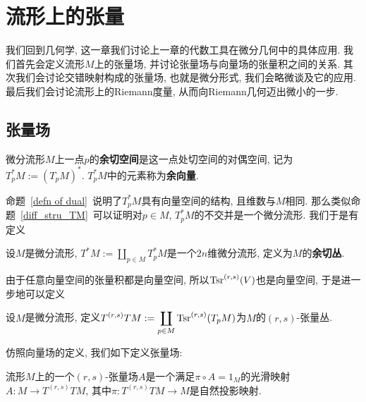 \chapter{流形上的张量}\label{chapter_tensorfield}
我们回到几何学, 这一章我们讨论上一章的代数工具在微分几何中的具体应用.
我们首先会定义流形$M$上的张量场, 并讨论张量场与向量场的张量积之间的关系.
其次我们会讨论交错映射构成的张量场, 也就是微分形式, 我们会略微谈及它的应用.
最后我们会讨论流形上的Riemann度量, 从而向Riemann几何迈出微小的一步.

\section{张量场}\label{section_tensorfield}
\begin{defn}
    微分流形$M$上一点$p$的\textbf{余切空间}是这一点处切空间的对偶空间, 记为$T^*_pM:=(T_pM)^*$.
    $T^*_pM$中的元素称为\textbf{余向量}.
\end{defn}

命题~\ref{defn of dual}~说明了$T^*_pM$具有向量空间的结构, 且维数与$M$相同.
那么类似命题~\ref{diff_stru_TM}~可以证明对$p\in M$, $T^*_pM$的不交并是一个微分流形.
我们于是有定义
\begin{defn}
    设$M$是微分流形, $\displaystyle T^*M:=\coprod_{p\in M}T^*_pM$是一个$2n$维微分流形, 定义为$M$的\textbf{余切丛}.
\end{defn}

由于任意向量空间的张量积都是向量空间, 所以$\operatorname{Tsr}^{(r,s)}(V)$也是向量空间, 于是进一步地可以定义
\begin{defn}
    设$M$是微分流形, 定义$\displaystyle T^{(r,s)}TM:=\coprod_{p\in M}\operatorname{Tsr}^{(r,s)}(T_pM)$为$M$的$(r,s)$-张量丛.
\end{defn}

仿照向量场的定义, 我们如下定义张量场:
\begin{defn}
    流形$M$上的一个$(r,s)$-张量场$A$是一个满足$\pi\circ A=1_M$的光滑映射$A:M\to T^{(r,s)}TM$, 其中$\pi:T^{(r,s)}TM\to M$是自然投影映射.
\end{defn}

